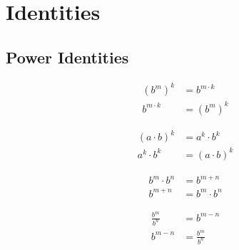 \documentclass[20150903-160354-rs2.2-MarksMathNotebook.tex]{subfiles}
\begin{document}
%
%

\chapter{Identities}


\section{Power Identities}

\begin{arule}
\begin{subequations}
\begin{align}
	(b^m)^k &=b^{m \cdot k} \label{eq:popo1}\\
	b^{m \cdot k} &= (b^m)^k \label{eq:popo2}
\end{align}
\end{subequations}
\end{arule}

\begin{arule}
\begin{subequations}
\begin{align}
	(a \cdot b)^k &=a^k \cdot b^k \label{eq:popr1}\\
	a^k \cdot b^k &= (a \cdot b)^k \label{eq:popr2}
\end{align}
\end{subequations}
\end{arule}

\begin{arule}
\begin{subequations}
\begin{align}
	b^m \cdot b^n &=b^{m+n} \label{eq:prcbpo1}\\
	b^{m+n} &= b^m \cdot b^n \label{eq:prcbpo2}
\end{align}
\end{subequations}
\end{arule}

\begin{arule}
\begin{subequations}
\begin{align}
	\frac{b^m}{b^n} &= b^{m-n} \label{eq:qcbpo1}\\
	b^{m-n} &= \frac{b^m}{b^n} \label{eq:qcbpo2}
\end{align}
\end{subequations}
\end{arule}
\end{document}
